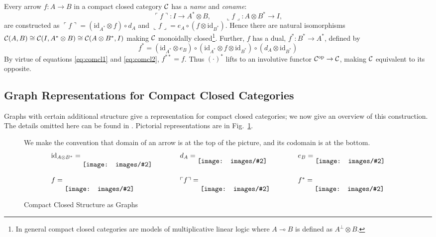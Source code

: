 \documentclass[runningheads]{llncs}
\newcommand{\iso}{\cong}
\newcommand{\name}[1]{%
\ulcorner #1 \urcorner}
\newcommand{\coname}[1]{%
\llcorner #1 \lrcorner}
\newcommand{\catC}{\ensuremath{{\cal C}}\xspace}
\newcommand{\id}[1]{\ensuremath{\mathrm{id}_{#1}}}
\newcommand{\inlinegraphic}[2]{
  \dimendef\grafheight=255\dimendef\grafvshift=254
  \grafheight=#1
  \grafvshift=-0.5\grafheight
  \advance\grafvshift by 0.5ex
  \raisebox{\grafvshift}{\texttt{[image: images/\#2]}\xspace}
}
\begin{document}
Every arrow $f:A\to B$ in a compact closed category \catC
has a \emph{name} and \emph{coname}:
\[
\name{f} : I \to A^* \otimes B, \qquad \coname{f} : A \otimes  B^* \to I,
\]
are constructed as $\name{f} = (\id{A^*}\otimes f) \circ d_A$ and
$\coname{f} = e_A \circ (f \otimes \id{B^*})$.  Hence there are natural
isomorphisms $\catC(A,B) \iso \catC(I,A^*\otimes B) \iso
\catC(A\otimes B^*,I)$ making \catC monoidally closed\footnote{In
  general compact closed categories  are models of multiplicative
  linear logic where $A \multimap B$ is defined as $A^\bot \otimes B$.}.
Further,  $f$ has a dual, $f^* : B^* \to A^*$, defined by 
\[
f^* = (\id{A^*} \otimes e_B) \circ (\id{A^*}\otimes f \otimes
\id{B^*}) \circ (d_A \otimes \id{B^*})
\]
By virtue of equations \eqref{eq:comcl1} and \eqref{eq:comcl2}, $f^{**} =
f$.  Thus $(\cdot)^*$ lifts to an involutive functor
$\catC^{\text{op}} \to \catC$,  making $\catC$ equivalent to its
opposite.

\subsection{Graph Representations for Compact Closed Categories}
\label{sec:graph-repr-comp}

Graphs with certain additional structure give a
representation for compact closed  categories; we now give an overview
of this construction.  The details omitted here can be found in
\cite{Duncan:thesis:2006}.   Pictorial representations are in
Fig.~\ref{fig:comcl-graphs}.

\begin{figure}
  We make the convention that domain of an arrow is at the top of the
  picture, and its codomain is at the bottom.
  \centering
  \[
  \begin{array}{lllll}
      \id{A \otimes B^*} = \inlinegraphic{3em}{comcl-id}
      &\qquad&
      d_A = \inlinegraphic{2em}{comcl-eta}
      &\qquad& 
      e_B = \inlinegraphic{2em}{comcl-epsilon} 
      \\\\
      f = \inlinegraphic{3em}{comcl-f} 
      & \qquad &
      \name{f} = \inlinegraphic{3em}{comcl-name-f}
      &\qquad &
      f^* =  \inlinegraphic{3em}{comcl-dual-f}
  \end{array}
  \]
  \caption{Compact Closed Structure as Graphs}
  \label{fig:comcl-graphs}
\end{figure}
\end{document}

